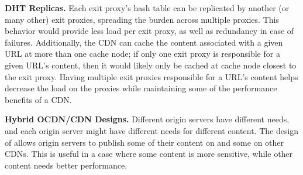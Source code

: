 \textbf{DHT Replicas.}
Each exit proxy's hash table can be replicated by another (or many other) exit proxies, spreading the burden across multiple proxies. This behavior would provide less load per exit proxy, as well as redundancy in case of failures.  Additionally, 
the CDN can cache the content associated with a given URL at more than one cache
node;
if only one exit proxy is responsible for a given URL's content, then it would likely only be cached at 
cache node closest to the exit proxy.  Having multiple exit proxies responsible for a URL's content 
helps decrease the load on the proxies while maintaining some of the performance benefits of a CDN.


\textbf{Hybrid OCDN/CDN Designs.}
Different origin servers have different needs, and each origin server might 
have different needs for different content.  The design of \system{} allows origin servers
 to publish some of their content on \system{} and some on other CDNs.  
This is useful in a case where some content is more sensitive, while other content needs 
better performance.



